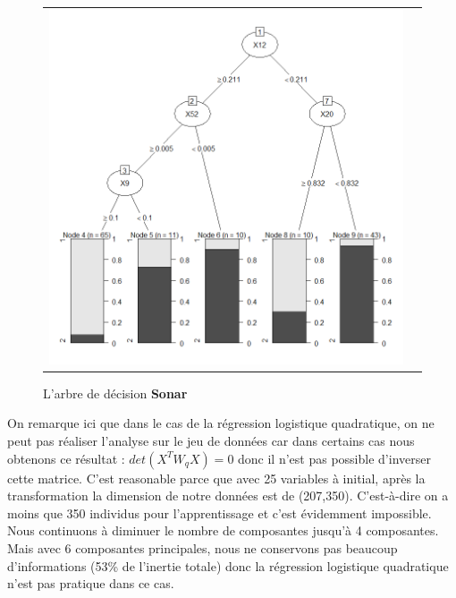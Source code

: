 \documentclass[a4paper,11pt,oneside,roman]{article}
\begin{document}
\begin{figure}[htb]
    \centering
    \begin{tabular}{cc}
    \includegraphics[scale = .4]{./discrimination/Sonar/tree_plot.png} &
    \end{tabular}
    \caption{L'arbre de décision \textbf{Sonar}}
    \label{fig:my_label}
\end{figure}
On remarque ici que dans le cas de la régression logistique quadratique, on ne peut pas réaliser l'analyse sur le jeu de données car dans certains cas nous obtenons ce résultat : $det(X^{T}W_{q}X) =  0$ donc il n'est pas possible d'inverser cette matrice. C'est reasonable parce que avec 25 variables à initial, après la transformation la dimension de notre données est de (207,350). C'est-à-dire on a moins que 350 individus pour l'apprentissage et c'est évidemment impossible. Nous continuons à diminuer le nombre de composantes jusqu'à 4 composantes. Mais avec 6 composantes principales, nous ne conservons pas beaucoup d'informations (53\% de l'inertie totale) donc la régression logistique quadratique n'est pas pratique dans ce cas. 
\newline
\end{document}
